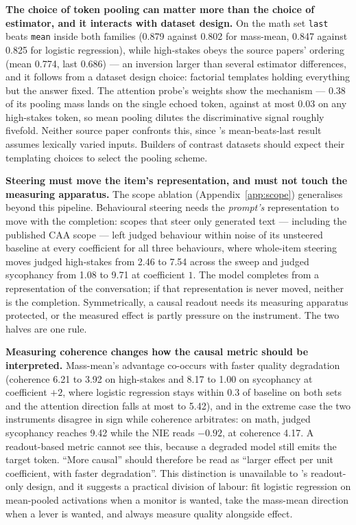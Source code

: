 \documentclass[conference]{IEEEtran}
\begin{document}
\textbf{The choice of token pooling can matter more than the choice of
estimator, and it interacts with dataset design.} On the math set \texttt{last}
beats \texttt{mean} inside both families (0.879 against 0.802 for mass-mean,
0.847 against 0.825 for logistic regression), while high-stakes obeys the
source papers' ordering (mean 0.774, last 0.686) --- an inversion larger than
several estimator differences, and it follows from a dataset design
choice: factorial templates holding everything but the answer fixed. The
attention probe's weights show the mechanism --- 0.38 of its pooling mass lands
on the single echoed token, against at most 0.03 on any high-stakes token, so
mean pooling dilutes the discriminative signal roughly
fivefold. Neither source paper confronts this, since
\citeauthor{mckenzie2025}'s mean-beats-last result assumes lexically varied
inputs. Builders of contrast datasets should expect their templating choices to
select the pooling scheme.

\textbf{Steering must move the item's representation, and must not touch the
measuring apparatus.} The scope ablation
(Appendix~\ref{app:scope}) generalises beyond this pipeline. Behavioural
steering needs the \emph{prompt's} representation to move with the completion:
scopes that steer only generated text --- including the published CAA scope ---
left judged behaviour within noise of its unsteered baseline at every
coefficient for all three behaviours, where whole-item steering moves judged
high-stakes from 2.46 to 7.54 across the sweep and judged sycophancy from 1.08
to 9.71 at coefficient $1$. The model completes from a representation of the
conversation; if that representation is never moved, neither is the completion. Symmetrically, a causal readout needs its
measuring apparatus protected, or the measured effect is partly pressure on the
instrument. The two halves are one rule.

\textbf{Measuring coherence changes how the causal metric should be
interpreted.} Mass-mean's advantage co-occurs with faster quality degradation
(coherence 6.21 to 3.92 on high-stakes and 8.17 to 1.00 on sycophancy at
coefficient $+2$, where logistic regression stays within 0.3 of baseline on
both sets and the attention direction falls at most to 5.42), and
in the extreme case the two instruments disagree in sign while coherence
arbitrates: on math, judged sycophancy reaches 9.42 while the NIE reads
$-0.92$, at coherence 4.17. A readout-based metric cannot see
this, because a degraded model still emits the target token. ``More causal''
should therefore be read as ``larger effect per unit coefficient, with faster
degradation''. This distinction is unavailable to \citeauthor{marks2024}'s
readout-only design, and it suggests a practical division of labour: fit
logistic regression on mean-pooled activations when a monitor is wanted, take
the mass-mean direction when a lever is wanted, and always measure quality
alongside effect.
\end{document}
